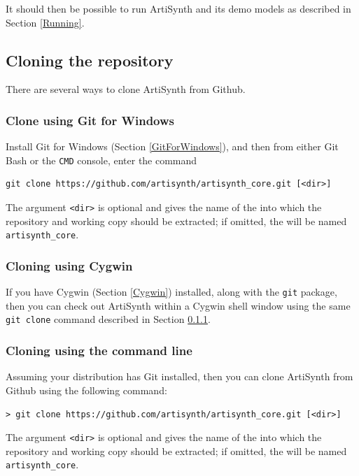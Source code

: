 It should then be possible to run ArtiSynth and its demo models as
described in Section \ref{Running}.

\subsection{Cloning the repository}
\label{Cloning}

There are several ways to clone ArtiSynth from Github.

\ifWindows

\subsubsection{Clone using Git for Windows}
\label{CloningUsingGitForWindows}

Install Git for Windows (Section \ref{GitForWindows}), and then from
either Git Bash or the {\tt CMD} console, enter the command
%
\begin{lstlisting}[]
  git clone https://github.com/artisynth/artisynth_core.git [<dir>]
\end{lstlisting}
%
The argument {\tt <dir>} is optional and gives the name of the
\directory{} into which the repository and working copy should be
extracted; if omitted, the \directory{} will be named {\tt
artisynth\_core}.

\subsubsection{Cloning using Cygwin}

If you have Cygwin (Section \ref{Cygwin}) installed, along with the
{\tt git} package, then you can check out ArtiSynth within a Cygwin
shell window using the same {\tt git clone} command described
in Section \ref{CloningUsingGitForWindows}.

\else %
\subsubsection{Cloning using the command line}

Assuming your \SYSTEM{} distribution has Git installed, then you can
clone ArtiSynth from Github using the following command:
%
\begin{lstlisting}[]
 > git clone https://github.com/artisynth/artisynth_core.git [<dir>]
\end{lstlisting}
%
The argument {\tt <dir>} is optional and gives the name of the
\directory{} into which the repository and working copy should be
extracted; if omitted, the \directory{} will be named {\tt
artisynth\_core}.
\fi %

